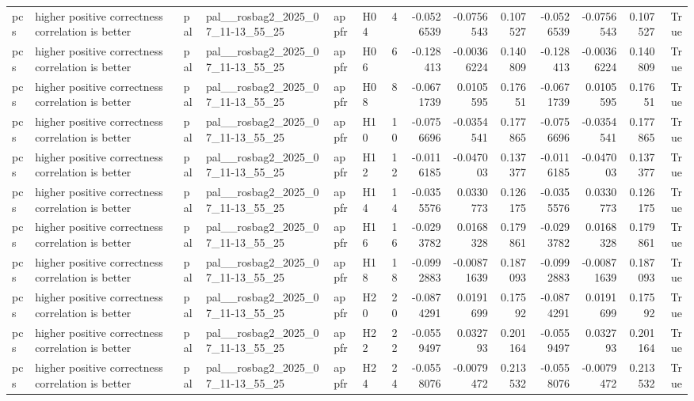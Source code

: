 \begin{longtable}{llllllrrrrrrrr}
pcs & higher positive correctness correlation is better & pal & pal\_\_rosbag2\_2025\_07\_11-13\_55\_25 & appfr & H04 & 4 & -0.0526539 & -0.0756543 & 0.107527 & -0.0526539 & -0.0756543 & 0.107527 & True \\
pcs & higher positive correctness correlation is better & pal & pal\_\_rosbag2\_2025\_07\_11-13\_55\_25 & appfr & H06 & 6 & -0.128413 & -0.00366224 & 0.140809 & -0.128413 & -0.00366224 & 0.140809 & True \\
pcs & higher positive correctness correlation is better & pal & pal\_\_rosbag2\_2025\_07\_11-13\_55\_25 & appfr & H08 & 8 & -0.0671739 & 0.0105595 & 0.17651 & -0.0671739 & 0.0105595 & 0.17651 & True \\
pcs & higher positive correctness correlation is better & pal & pal\_\_rosbag2\_2025\_07\_11-13\_55\_25 & appfr & H10 & 10 & -0.0756696 & -0.0354541 & 0.177865 & -0.0756696 & -0.0354541 & 0.177865 & True \\
pcs & higher positive correctness correlation is better & pal & pal\_\_rosbag2\_2025\_07\_11-13\_55\_25 & appfr & H12 & 12 & -0.0116185 & -0.047003 & 0.137377 & -0.0116185 & -0.047003 & 0.137377 & True \\
pcs & higher positive correctness correlation is better & pal & pal\_\_rosbag2\_2025\_07\_11-13\_55\_25 & appfr & H14 & 14 & -0.0355576 & 0.0330773 & 0.126175 & -0.0355576 & 0.0330773 & 0.126175 & True \\
pcs & higher positive correctness correlation is better & pal & pal\_\_rosbag2\_2025\_07\_11-13\_55\_25 & appfr & H16 & 16 & -0.0293782 & 0.0168328 & 0.179861 & -0.0293782 & 0.0168328 & 0.179861 & True \\
pcs & higher positive correctness correlation is better & pal & pal\_\_rosbag2\_2025\_07\_11-13\_55\_25 & appfr & H18 & 18 & -0.0992883 & -0.00871639 & 0.187093 & -0.0992883 & -0.00871639 & 0.187093 & True \\
pcs & higher positive correctness correlation is better & pal & pal\_\_rosbag2\_2025\_07\_11-13\_55\_25 & appfr & H20 & 20 & -0.0874291 & 0.0191699 & 0.17592 & -0.0874291 & 0.0191699 & 0.17592 & True \\
pcs & higher positive correctness correlation is better & pal & pal\_\_rosbag2\_2025\_07\_11-13\_55\_25 & appfr & H22 & 22 & -0.0559497 & 0.032793 & 0.201164 & -0.0559497 & 0.032793 & 0.201164 & True \\
pcs & higher positive correctness correlation is better & pal & pal\_\_rosbag2\_2025\_07\_11-13\_55\_25 & appfr & H24 & 24 & -0.0558076 & -0.0079472 & 0.213532 & -0.0558076 & -0.0079472 & 0.213532 & True \\

\end{longtable}
